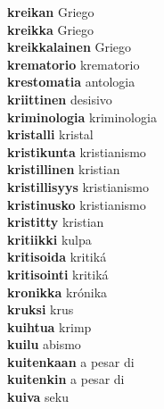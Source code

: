 \textbf{kreikan } Griego \\
\textbf{kreikka } Griego \\
\textbf{kreikkalainen } Griego \\
\textbf{krematorio } krematorio \\
\textbf{krestomatia } antologia \\
\textbf{kriittinen } desisivo \\
\textbf{kriminologia } kriminologia \\
\textbf{kristalli } kristal \\
\textbf{kristikunta } kristianismo \\
\textbf{kristillinen } kristian \\
\textbf{kristillisyys } kristianismo \\
\textbf{kristinusko } kristianismo \\
\textbf{kristitty } kristian \\
\textbf{kritiikki } kulpa \\
\textbf{kritisoida } kritiká \\
\textbf{kritisointi } kritiká \\
\textbf{kronikka } krónika \\
\textbf{kruksi } krus \\
\textbf{kuihtua } krimp \\
\textbf{kuilu } abismo \\
\textbf{kuitenkaan } a pesar di \\
\textbf{kuitenkin } a pesar di \\
\textbf{kuiva } seku \\
